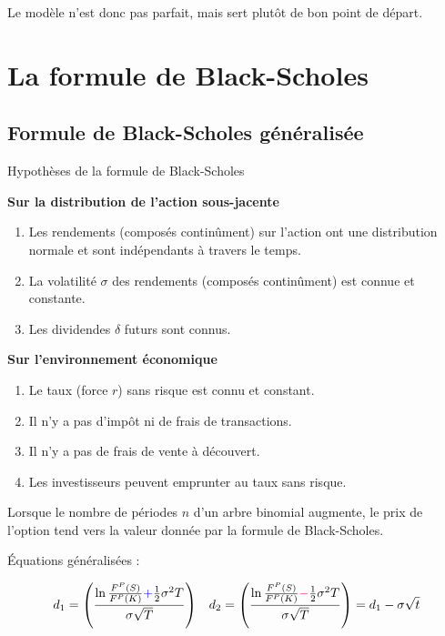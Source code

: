 \documentclass[10pt, french]{article}
\begin{document}
\begin{multicols*}{2}
Le modèle n'est donc pas parfait, mais sert plutôt de bon point de départ.

\newpage
\section{La formule de Black-Scholes}

\subsection{Formule de Black-Scholes généralisée}
\begin{conceptgen}{Hypothèses de la formule de Black-Scholes}
\begin{center}
	\textbf{Sur la distribution de l'action sous-jacente}
\end{center}
\begin{enumerate}[label = \alph*)]
	\item	Les rendements (composés continûment) sur l'action ont une distribution normale et sont indépendants à travers le temps.
	\item	La volatilité $\sigma$ des rendements (composés continûment) est connue et constante.
	\item	Les dividendes $\delta$ futurs sont connus.
\end{enumerate}
\tcbline
\begin{center}
	\textbf{Sur l'environnement économique}
\end{center}
\begin{enumerate}[label = \alph*)]
	\item	Le taux (force $r$) sans risque est connu et constant.
	\item	Il n'y a pas d'impôt	 ni de frais de transactions.
	\item	Il n'y a pas de frais de vente à découvert.
	\item	Les investisseurs peuvent emprunter au taux sans risque.
\end{enumerate}
\end{conceptgen}

Lorsque le nombre de périodes $n$ d'un arbre binomial augmente, le prix de l'option tend vers la valeur donnée par la formule de Black-Scholes.

\begin{definitionNOHFILL}
Équations généralisées :

\begin{align*}
	d_{1}
	&=	\left(
			\frac{\ln\frac{F^{P}(S)}{F^{P}(K)} {\color{blue}{+}} \frac{1}{2} \sigma^{2} T}
	 			 {\sigma\sqrt{T}}
		\right)	&
	d_{2}
	&=	\left(
			\frac{\ln\frac{F^{P}(S)}{F^{P}(K)} {\color{red}{-}} \frac{1}{2} \sigma^{2} T}
	 			 {\sigma\sqrt{T}}
		\right)	
	=	d_{1} - \sigma \sqrt{t}	\\
\end{align*}


\end{definitionNOHFILL}
\end{multicols*}
\end{document}
